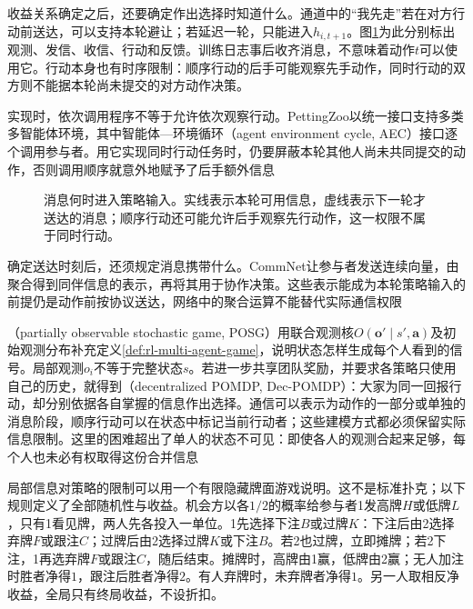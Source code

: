 收益关系确定之后，还要确定作出选择时知道什么。通道中的“我先走”若在对方行动前送达，可以支持本轮避让；若延迟一轮，只能进入$h_{i,t+1}$。图\ref{fig:rl-multi-agent-timing}为此分别标出观测、发信、收信、行动和反馈。训练日志事后收齐消息，不意味着动作$t$可以使用它。行动本身也有时序限制：顺序行动的后手可能观察先手动作，同时行动的双方则不能据本轮尚未提交的对方动作决策。

实现时，依次调用程序不等于允许依次观察行动。PettingZoo以统一接口支持多类多智能体环境，其中智能体—环境循环（agent environment cycle, AEC）接口逐个调用参与者。用它实现同时行动任务时，仍要屏蔽本轮其他人尚未共同提交的动作，否则调用顺序就意外地赋予了后手额外信息

\begin{figure}[htbp]
 \centering
 
 \caption{消息何时进入策略输入。实线表示本轮可用信息，虚线表示下一轮才送达的消息；顺序行动还可能允许后手观察先行动作，这一权限不属于同时行动。}
 \label{fig:rl-multi-agent-timing}
\end{figure}

确定送达时刻后，还须规定消息携带什么。CommNet让参与者发送连续向量，由聚合得到同伴信息的表示，再将其用于协作决策。这些表示能成为本轮策略输入的前提仍是动作前按协议送达，网络中的聚合运算不能替代实际通信权限

（partially observable stochastic game, POSG）用联合观测核$O(\bm o'\mid s',\bm a)$及初始观测分布补充定义\ref{def:rl-multi-agent-game}，说明状态怎样生成每个人看到的信号。局部观测$o_i$不等于完整状态$s$。若进一步共享团队奖励，并要求各策略只使用自己的历史，就得到（decentralized POMDP, Dec-POMDP）：大家为同一回报行动，却分别依据各自掌握的信息作出选择。通信可以表示为动作的一部分或单独的消息阶段，顺序行动可以在状态中标记当前行动者；这些建模方式都必须保留实际信息限制。这里的困难超出了单人的状态不可见：即使各人的观测合起来足够，每个人也未必有权取得这份合并信息

局部信息对策略的限制可以用一个有限隐藏牌面游戏说明。这不是标准扑克；以下规则定义了全部随机性与收益。机会方以各$1/2$的概率给参与者1发高牌$H$或低牌$L$，只有1看见牌，两人先各投入一单位。1先选择下注$B$或过牌$K$：下注后由2选择弃牌$F$或跟注$C$；过牌后由2选择过牌$K$或下注$B$。若2也过牌，立即摊牌；若2下注，1再选弃牌$F$或跟注$C$，随后结束。摊牌时，高牌由1赢，低牌由2赢；无人加注时胜者净得$1$，跟注后胜者净得$2$。有人弃牌时，未弃牌者净得$1$。另一人取相反净收益，全局只有终局收益，不设折扣。

